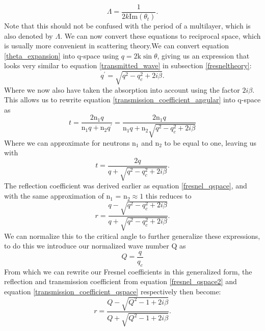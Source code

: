 \begin{equation}\label{penetration_depth_angular}
	\Lambda = \frac{1}{2k \textrm{Im}(\theta_t)}.
\end{equation} 
Note that this should not be confused with the period of a multilayer, which is also denoted by $\Lambda$. We can now convert these equations to reciprocal space, which is usually more convenient in scattering theory.We can convert equation \ref{theta_expansion} into q-space using $q = \textrm{2k} \sin{\theta}$, giving us an expression that looks very similar to equation \ref{transmitted_wave} in subsection \ref{fresneltheory}:
\begin{equation}
	q^{\prime} = \sqrt{q^2 - q_c^2 + 2i\beta}.
\end{equation}
Where we now also have taken the absorption into account using the factor $2i\beta$. This allows us to rewrite equation \ref{transmission_coefficient_angular} into q-space as
\begin{equation}\label{transmission_coefficient_qspace}
	t = \frac{2\textrm{n}_1q}{\textrm{n}_1 q + \textrm{n}_2 q^{\prime}} = \frac{2\textrm{n}_1q}{\textrm{n}_1 q + \textrm{n}_2\sqrt{q^2 -  q_c^2 + 2i\beta}}
\end{equation}
Where we can approximate for neutrons n$_1$ and n$_2$ to be equal to one, leaving us with
\begin{equation}\label{transmission_coefficient_qspace_vacuum}
	t = \frac{2q}{q + \sqrt{q^2 -  q_c^2 + 2i\beta}}.
\end{equation}
The reflection coefficient was derived earlier as equation \ref{fresnel_qspace}, and with the same approximation of n$_1$ = n$_2 \approx 1$ this reduces to
\begin{equation}\label{fresnel_qspace2}
	r = \frac{q - \sqrt{q^2 - q_c^2 + 2i\beta}}{q + \sqrt{q^2 -  q_c^2 + 2i\beta}}.
\end{equation}
We can normalize this to the critical angle to further generalize these expressions, to do this we introduce our normalized wave number Q as
\begin{equation}
	Q = \frac{q}{q_c} 
\end{equation}
From which we can rewrite our Fresnel coefficients in this generalized form, the reflection and transmission coefficient from equation \ref{fresnel_qspace2} and equation \ref{transmission_coefficient_qspace} respectively then become:
\begin{equation}\label{fresnel_qspace_qnorm}
	r = \frac{Q - \sqrt{Q^2 - 1 + 2i\beta}}{Q + \sqrt{Q^2 - 1 + 2i\beta}}.
\end{equation}
